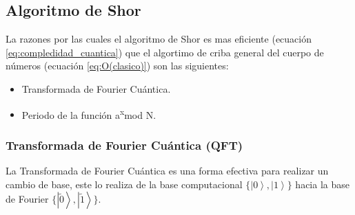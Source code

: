 \subsection{Algoritmo de Shor}
La razones por las cuales el algoritmo de Shor es mas eficiente (ecuación \ref{eq:compledidad_cuantica}) que el algortimo de criba general del cuerpo de números (ecuación \ref{eq:O(clasico)}) son las siguientes:
\begin{itemize}
    \item Transformada de Fourier Cuántica.
    \item Periodo de la función a\textsuperscript{x}mod N.
\end{itemize}
\subsubsection{Transformada de Fourier Cuántica (QFT)}
La Transformada de Fourier Cuántica es una forma efectiva para realizar un cambio de base, este lo realiza de la base computacional $\lbrace \left|0 \right\rangle,\left|1 \right\rangle \rbrace$ hacia 
la base de Fourier $\lbrace \left| \tilde{0} \right\rangle,\left| \tilde{1} \right\rangle \rbrace$.
